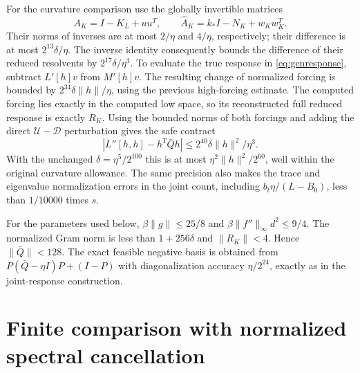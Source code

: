 \documentclass[11pt]{amsart}
\theoremstyle{remark}\newtheorem{remark}[theorem]{Remark}
\begin{document}
For the curvature comparison use the globally invertible matrices
\[
 A_K=I-K_L+uu^T,\qquad
 \widehat A_K=k_*I-N_K+w_Kw_K^T.
\]
Their norms of inverses are at most $2/\eta$ and $4/\eta$, respectively;
their difference is at most $2^{13}\delta/\eta$.
The inverse identity consequently bounds the difference of their reduced
resolvents by $2^{17}\delta/\eta^3$.
To evaluate the true response in \eqref{eq:genresponse}, subtract
$L'[h]v$ from $M'[h]v$. The resulting change of normalized forcing is
bounded by $2^{34}\delta\|h\|/\eta$, using the previous high-forcing
estimate. The computed forcing lies exactly in the computed low space,
so its reconstructed full reduced response is exactly $R_K$.
Using the bounded norms of both forcings and adding the direct
$\mathcal U-\mathcal D$ perturbation gives the safe contract
\begin{equation}\label{eq:genproxyerror}
 |L''[h,h]-h^T\bar Qh|
 \le2^{40}\delta\|h\|^2/\eta^3.
\end{equation}
With the unchanged $\delta=\eta^5/2^{100}$ this is at most
$\eta^2\|h\|^2/2^{60}$, well within the original curvature allowance.
The same precision also makes the trace and eigenvalue normalization
errors in the joint count, including $b_t\eta/(L-B_0)$, less than
$1/10000$ times $s$.

For the parameters used below, $\beta\|g\|\le25/8$ and
$\beta\|f''\|_\infty d^2\le9/4$. The normalized Gram norm is less than
$1+256\delta$ and $\|R_K\|<4$. Hence $\|\bar Q\|<128$.
The exact feasible negative basis is obtained from
$P(\bar Q-\eta I)P+(I-P)$ with diagonalization accuracy
$\eta/2^{24}$, exactly as in the joint-response construction.

\section{Finite comparison with normalized spectral cancellation}
\end{document}
